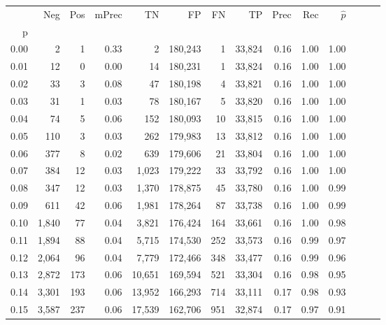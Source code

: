\begin{tabular}{rrrrrrrrrrrrrr}
\toprule
{} &    Neg &    Pos & mPrec &       TN &       FP &      FN &      TP &  Prec &   Rec & $\hat{p}$ \\
p    &        &        &       &          &          &         &         &       &       &           \\
\midrule
0.00 &      2 &      1 &  0.33 &        2 &  180,243 &       1 &  33,824 &  0.16 &  1.00 &      1.00 \\
0.01 &     12 &      0 &  0.00 &       14 &  180,231 &       1 &  33,824 &  0.16 &  1.00 &      1.00 \\
0.02 &     33 &      3 &  0.08 &       47 &  180,198 &       4 &  33,821 &  0.16 &  1.00 &      1.00 \\
0.03 &     31 &      1 &  0.03 &       78 &  180,167 &       5 &  33,820 &  0.16 &  1.00 &      1.00 \\
0.04 &     74 &      5 &  0.06 &      152 &  180,093 &      10 &  33,815 &  0.16 &  1.00 &      1.00 \\
0.05 &    110 &      3 &  0.03 &      262 &  179,983 &      13 &  33,812 &  0.16 &  1.00 &      1.00 \\
0.06 &    377 &      8 &  0.02 &      639 &  179,606 &      21 &  33,804 &  0.16 &  1.00 &      1.00 \\
0.07 &    384 &     12 &  0.03 &    1,023 &  179,222 &      33 &  33,792 &  0.16 &  1.00 &      1.00 \\
0.08 &    347 &     12 &  0.03 &    1,370 &  178,875 &      45 &  33,780 &  0.16 &  1.00 &      0.99 \\
0.09 &    611 &     42 &  0.06 &    1,981 &  178,264 &      87 &  33,738 &  0.16 &  1.00 &      0.99 \\
0.10 &  1,840 &     77 &  0.04 &    3,821 &  176,424 &     164 &  33,661 &  0.16 &  1.00 &      0.98 \\
0.11 &  1,894 &     88 &  0.04 &    5,715 &  174,530 &     252 &  33,573 &  0.16 &  0.99 &      0.97 \\
0.12 &  2,064 &     96 &  0.04 &    7,779 &  172,466 &     348 &  33,477 &  0.16 &  0.99 &      0.96 \\
0.13 &  2,872 &    173 &  0.06 &   10,651 &  169,594 &     521 &  33,304 &  0.16 &  0.98 &      0.95 \\
0.14 &  3,301 &    193 &  0.06 &   13,952 &  166,293 &     714 &  33,111 &  0.17 &  0.98 &      0.93 \\
0.15 &  3,587 &    237 &  0.06 &   17,539 &  162,706 &     951 &  32,874 &  0.17 &  0.97 &      0.91 \\

\end{tabular}
